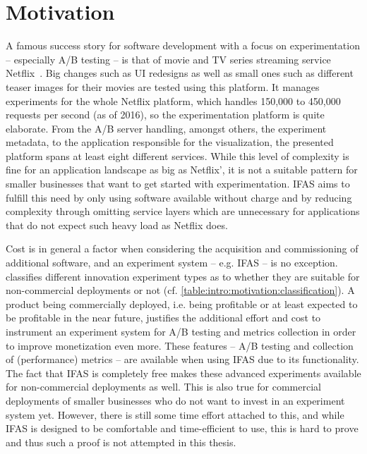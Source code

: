 
\section{Motivation}
\label{sec:intro:motivation}

A famous success story for software development with a focus on experimentation -- especially A/B testing -- is that of movie and TV series streaming service Netflix~\cite{WEB:Netflix:2016}.
Big changes such as UI redesigns as well as small ones such as different teaser images for their movies are tested using this platform.
It manages experiments for the whole Netflix platform, which handles 150,000 to 450,000 requests per second (as of 2016), so the experimentation platform is quite elaborate.
From the A/B server handling, amongst others, the experiment metadata, to the application responsible for the visualization, the presented platform spans at least eight different services.
While this level of complexity is fine for an application landscape as big as Netflix', it is not a suitable pattern for smaller businesses that want to get started with experimentation.
\ac{IFAS} aims to fulfill this need by only using software available without charge and by reducing complexity through omitting service layers which are unnecessary for applications that do not expect such heavy load as Netflix does.

Cost is in general a factor when considering the acquisition and commissioning of additional software, and an experiment system -- e.g. \ac{IFAS} -- is no exception.
\citet{Bosch2012} classifies different innovation experiment types as to whether they are suitable for non-commercial deployments or not (cf. \cref{table:intro:motivation:classification}).
A product being commercially deployed, i.e. being profitable or at least expected to be profitable in the near future, justifies the additional effort and cost to instrument an experiment system for A/B testing and metrics collection in order to improve monetization even more.
These features -- A/B testing and collection of (performance) metrics -- are available when using \ac{IFAS} due to its functionality.
The fact that \ac{IFAS} is completely free makes these advanced experiments available for non-commercial deployments as well.
This is also true for commercial deployments of smaller businesses who do not want to invest in an experiment system yet.
However, there is still some time effort attached to this, and while \ac{IFAS} is designed to be comfortable and time-efficient to use, this is hard to prove and thus such a proof is not attempted in this thesis.

